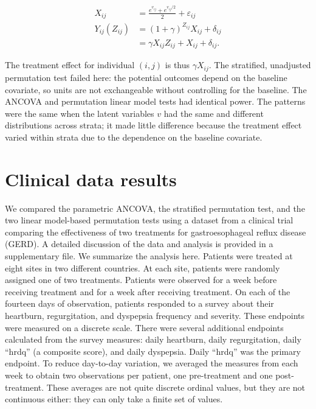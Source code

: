 \documentclass[12pt]{article}
\begin{document}
\begin{align*}
X_{ij} &=  \frac{ e^{v_{ij}} + e^{v_{ij}/2}}{2} +\varepsilon_{ij} \\
Y_{ij}(Z_{ij}) &= (1+\gamma)^{Z_{ij}} X_{ij}  + \delta_{ij} \\
&= \gamma X_{ij}Z_{ij} + X_{ij} + \delta_{ij}.
\end{align*}

The treatment effect for individual $(i, j)$ is thus $\gamma X_{ij}$.
The stratified, unadjusted permutation test failed here:
the potential outcomes depend on the baseline covariate, so units are not exchangeable without controlling for the baseline.
The ANCOVA and permutation linear model tests had identical power.
The patterns were the same when the latent variables $v$ had the same and different distributions across strata;
it made little difference because the treatment effect varied within strata due to the dependence on the baseline covariate.


\section{Clinical data results}\label{sec:results}
We compared the parametric ANCOVA, the stratified permutation test, and the two linear model-based permutation tests using a dataset from a clinical trial comparing the effectiveness of two treatments for gastroesophageal reflux disease (GERD).
A detailed discussion of the data and analysis is provided in a supplementary file.
We summarize the analysis here.
Patients were treated at eight sites in two different countries.
At each site, patients were randomly assigned one of two treatments.
Patients were observed for a week before receiving treatment and for a week after receiving treatment.
On each of the fourteen days of observation, patients responded to a survey about their heartburn, regurgitation, and dyspepsia frequency and severity.
These endpoints were measured on a discrete scale.
There were several additional endpoints calculated from the survey measures: daily heartburn, daily regurgitation, daily ``hrdq'' (a composite score), and daily dyspepsia.
Daily ``hrdq'' was the primary endpoint.
To reduce day-to-day variation, we averaged the measures from each week to obtain two observations per patient, one pre-treatment and one post-treatment.
These averages are not quite discrete ordinal values, but they are not continuous either: they can only take a finite set of values.
\end{document}
